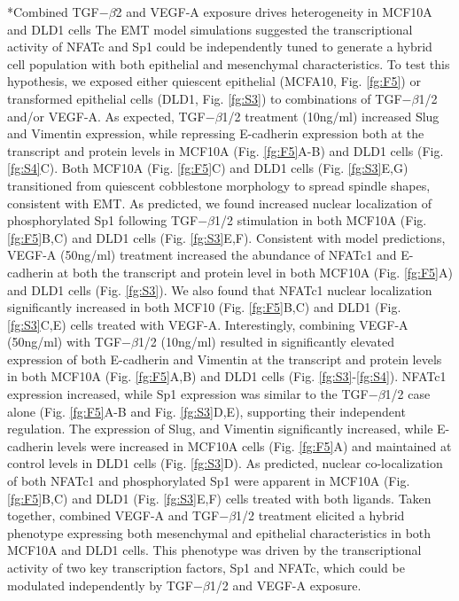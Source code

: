 \documentclass[12pt]{article}
\makeatletter
\renewcommand\subsection{\@startsection
	{subsection}{2}{0mm}
	{-0.05in}
	{-0.5\baselineskip}
	{\normalfont\normalsize\bfseries}}
\makeatother
\begin{document}
\subsection*{Combined TGF$-\beta$2 and VEGF-A exposure drives heterogeneity in MCF10A and DLD1 cells}
The EMT model simulations suggested the transcriptional activity of NFATc and Sp1 could be independently tuned to generate a hybrid cell population with both epithelial and mesenchymal characteristics.
To test this hypothesis, we exposed either quiescent epithelial (MCFA10, Fig. \ref{fg:F5}) or transformed epithelial cells (DLD1, Fig. \ref{fg:S3}) to combinations of TGF$-\beta$1/2 and/or VEGF-A. As expected, TGF$-\beta$1/2 treatment (10ng/ml) increased Slug and Vimentin expression, while repressing E-cadherin expression both at the transcript and protein levels in MCF10A (Fig. \ref{fg:F5}A-B) and DLD1 cells (Fig. \ref{fg:S4}C).
Both MCF10A (Fig. \ref{fg:F5}C) and DLD1 cells (Fig. \ref{fg:S3}E,G) transitioned from quiescent cobblestone morphology to spread spindle shapes, consistent with EMT.
As predicted, we found increased nuclear localization of phosphorylated Sp1 following TGF$-\beta$1/2 stimulation in both MCF10A (Fig. \ref{fg:F5}B,C) and DLD1 cells (Fig. \ref{fg:S3}E,F).
Consistent with model predictions, VEGF-A (50ng/ml) treatment increased the abundance of NFATc1 and E-cadherin at both the transcript and protein level in both MCF10A (Fig. \ref{fg:F5}A) and DLD1 cells (Fig. \ref{fg:S3}).
We also found that NFATc1 nuclear localization significantly increased in both MCF10 (Fig. \ref{fg:F5}B,C) and DLD1 (Fig. \ref{fg:S3}C,E) cells treated with VEGF-A.
Interestingly, combining VEGF-A (50ng/ml) with TGF$-\beta$1/2 (10ng/ml) resulted in significantly elevated expression of both E-cadherin and Vimentin at the transcript and protein levels in both MCF10A (Fig. \ref{fg:F5}A,B) and DLD1 cells (Fig. \ref{fg:S3}-\ref{fg:S4}).
NFATc1 expression increased, while Sp1 expression was similar to the TGF$-\beta$1/2 case alone (Fig. \ref{fg:F5}A-B and Fig. \ref{fg:S3}D,E),
supporting their independent regulation.
The expression of Slug, and Vimentin significantly increased, while E-cadherin levels were increased in MCF10A cells (Fig. \ref{fg:F5}A) and maintained at control levels in DLD1 cells
(Fig. \ref{fg:S3}D).
As predicted, nuclear co-localization of both NFATc1 and phosphorylated Sp1 were apparent in MCF10A (Fig. \ref{fg:F5}B,C) and DLD1 (Fig. \ref{fg:S3}E,F) cells treated with both ligands.
Taken together, combined VEGF-A and TGF$-\beta$1/2 treatment elicited a hybrid phenotype expressing both mesenchymal and epithelial characteristics in both MCF10A and DLD1 cells.
This phenotype was driven by the transcriptional activity of two key transcription factors, Sp1 and NFATc, which could be modulated independently by TGF$-\beta$1/2 and VEGF-A exposure.
\end{document}
